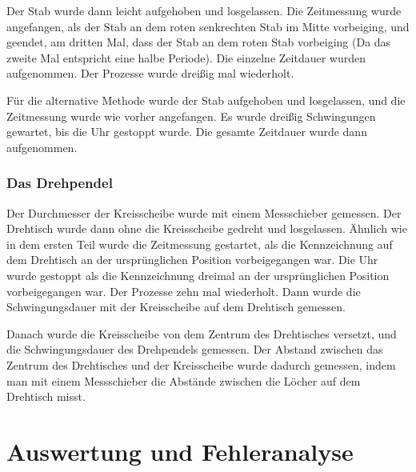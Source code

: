 \documentclass[11pt,a4paper]{article} %
\begin{document}
Der Stab wurde dann leicht aufgehoben und losgelassen. Die Zeitmessung wurde angefangen, als der Stab an dem roten senkrechten Stab im Mitte vorbeiging, und geendet, am dritten Mal, dass der Stab an dem roten Stab vorbeiging (Da das zweite Mal entspricht eine halbe Periode). Die einzelne Zeitdauer wurden aufgenommen. Der Prozesse wurde dreißig mal wiederholt. 

Für die alternative Methode wurde der Stab aufgehoben und losgelassen, und die Zeitmessung wurde wie vorher angefangen. Es wurde dreißig Schwingungen gewartet, bis die Uhr gestoppt wurde. Die gesamte Zeitdauer wurde dann aufgenommen. 


\subsubsection{Das Drehpendel}
Der Durchmesser der Kreisscheibe wurde mit einem Messschieber gemessen. Der Drehtisch wurde dann ohne die Kreisscheibe gedreht und losgelassen. Ähnlich wie in dem ersten Teil wurde die Zeitmessung gestartet, als die Kennzeichnung auf dem Drehtisch an der ursprünglichen Position vorbeigegangen war. Die Uhr wurde gestoppt als die Kennzeichnung dreimal an der ursprünglichen Position vorbeigegangen war. Der Prozesse zehn mal wiederholt. Dann wurde die Schwingungsdauer mit der Kreisscheibe auf dem Drehtisch gemessen. 

Danach wurde die Kreisscheibe von dem Zentrum des Drehtisches versetzt, und die Schwingungsdauer des Drehpendels gemessen. Der Abstand zwischen das Zentrum des Drehtisches und der Kreisscheibe wurde dadurch gemessen, indem man mit einem Messschieber die Abstände zwischen die Löcher auf dem Drehtisch misst.


\FloatBarrier
\section{Auswertung und Fehleranalyse}
\end{document}
